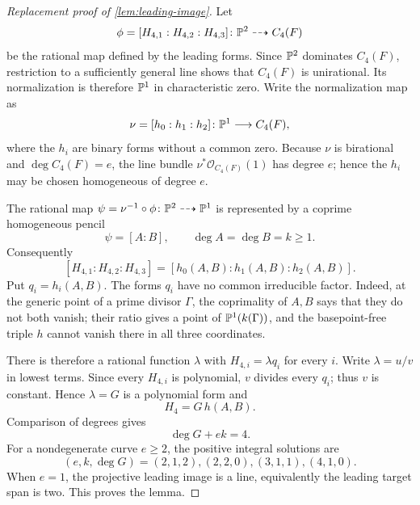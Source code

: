 

\begin{proof}[Replacement proof of \cref{lem:leading-image}]
Let
\[
 \phi=[H_{4,1}:H_{4,2}:H_{4,3}]\colon \mathbb P^2\dashrightarrow C_4(F)
\]
be the rational map defined by the leading forms.  Since \(\mathbb P^2\)
dominates \(C_4(F)\), restriction to a sufficiently general line shows
that \(C_4(F)\) is unirational.  Its normalization is therefore \(\mathbb P^1\)
in characteristic zero.  Write the normalization map as
\[
 \nu=[h_0:h_1:h_2]\colon \mathbb P^1\longrightarrow C_4(F),
\]
where the \(h_i\) are binary forms without a common zero.  Because \(\nu\)
is birational and \(\deg C_4(F)=e\), the line bundle
\(\nu^*\mathcal O_{C_4(F)}(1)\) has degree \(e\); hence the \(h_i\) may be
chosen homogeneous of degree \(e\).

The rational map \(\psi=\nu^{-1}\circ\phi\colon\mathbb P^2\dashrightarrow\mathbb P^1\)
is represented by a coprime homogeneous pencil
\[
 \psi=[A:B],\qquad \deg A=\deg B=k\ge1.
\]
Consequently
\[
 [H_{4,1}:H_{4,2}:H_{4,3}]
   =[h_0(A,B):h_1(A,B):h_2(A,B)].
\]
Put \(q_i=h_i(A,B)\).  The forms \(q_i\) have no common irreducible
factor.  Indeed, at the generic point of a prime divisor \(\Gamma\), the
coprimality of \(A,B\) says that they do not both vanish; their ratio gives
a point of \(\mathbb P^1(k(\Gamma))\), and the basepoint-free triple \(h\) cannot
vanish there in all three coordinates.

There is therefore a rational function \(\lambda\) with
\(H_{4,i}=\lambda q_i\) for every \(i\).  Write \(\lambda=u/v\) in lowest
terms.  Since every \(H_{4,i}\) is polynomial, \(v\) divides every \(q_i\);
thus \(v\) is constant.  Hence \(\lambda=G\) is a polynomial form and
\[
 H_4=G\,h(A,B).
\]
Comparison of degrees gives
\[
 \deg G+ek=4.
\]
For a nondegenerate curve \(e\ge2\), the positive integral solutions are
\[
 (e,k,\deg G)=(2,1,2),(2,2,0),(3,1,1),(4,1,0).
\]
When \(e=1\), the projective leading image is a line, equivalently the
leading target span is two.  This proves the lemma.
\end{proof}

